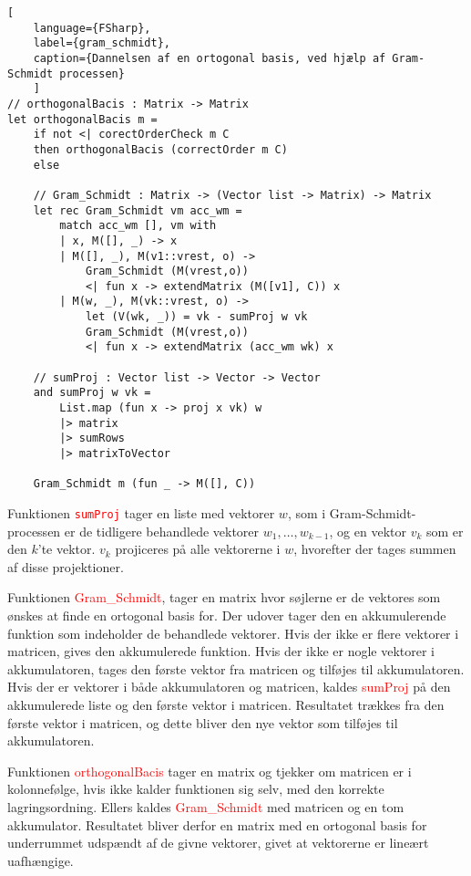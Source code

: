 \begin{lstlisting}[
    language={FSharp}, 
    label={gram_schmidt}, 
    caption={Dannelsen af en ortogonal basis, ved hjælp af Gram-Schmidt processen}
    ]
// orthogonalBacis : Matrix -> Matrix
let orthogonalBacis m =
    if not <| corectOrderCheck m C  
    then orthogonalBacis (correctOrder m C)
    else

    // Gram_Schmidt : Matrix -> (Vector list -> Matrix) -> Matrix
    let rec Gram_Schmidt vm acc_wm =
        match acc_wm [], vm with
        | x, M([], _) -> x 
        | M([], _), M(v1::vrest, o) -> 
            Gram_Schmidt (M(vrest,o)) 
            <| fun x -> extendMatrix (M([v1], C)) x 
        | M(w, _), M(vk::vrest, o) -> 
            let (V(wk, _)) = vk - sumProj w vk
            Gram_Schmidt (M(vrest,o)) 
            <| fun x -> extendMatrix (acc_wm wk) x

    // sumProj : Vector list -> Vector -> Vector
    and sumProj w vk =
        List.map (fun x -> proj x vk) w 
        |> matrix 
        |> sumRows
        |> matrixToVector
        
    Gram_Schmidt m (fun _ -> M([], C))
\end{lstlisting}


Funktionen \textcolor{red}{\texttt{sumProj}} tager en liste med vektorer \(w\), som i Gram-Schmidt-processen er de tidligere behandlede vektorer \(w_1, \ldots, w_{k-1}\), og en vektor \(v_k\) som er den \(k\)'te vektor. $v_k$ projiceres på alle vektorerne i \(w\), hvorefter der tages summen af disse projektioner.

Funktionen \textcolor{red}{Gram\_Schmidt}, tager en matrix hvor søjlerne er de vektores som ønskes at finde en ortogonal basis for. Der udover tager den en akkumulerende funktion som indeholder de behandlede vektorer. Hvis der ikke er flere vektorer i matricen, gives den akkumulerede funktion. Hvis der ikke er nogle vektorer i akkumulatoren, tages den første vektor fra matricen og tilføjes til akkumulatoren. Hvis der er vektorer i både akkumulatoren og matricen, kaldes \textcolor{red}{sumProj} på den akkumulerede liste og den første vektor i matricen. Resultatet trækkes fra den første vektor i matricen, og dette bliver den nye vektor som tilføjes til akkumulatoren. 

Funktionen \textcolor{red}{orthogonalBacis} tager en matrix og tjekker om matricen er i kolonnefølge, hvis ikke kalder funktionen sig selv, med den korrekte lagringsordning. Ellers kaldes \textcolor{red}{Gram\_Schmidt} med matricen og en tom akkumulator. Resultatet bliver derfor en matrix med en ortogonal basis for underrummet udspændt af de givne vektorer, givet at vektorerne er lineært uafhængige.

